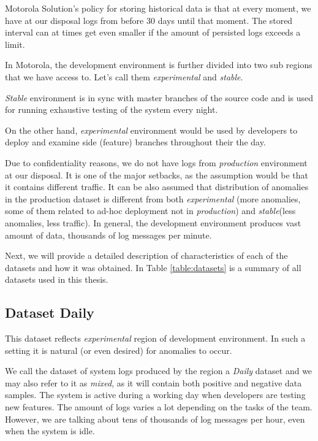 Motorola Solution's policy for storing historical data is that at every moment, we have at our disposal logs from before $30$ days until that moment. The stored interval can at times get even smaller if the amount of persisted logs exceeds a limit.

In Motorola, the development environment is further divided into two sub regions that we have access to. 
Let's call them \textit{experimental} and \textit{stable}. 

\textit{Stable} environment is in sync with master branches of the source code and is used for running exhaustive testing of the system every night. 

On the other hand, \textit{experimental} environment would be used by developers to deploy and examine side (feature) branches throughout their the day.

Due to confidentiality reasons, we do not have logs from \textit{production} environment at our disposal. It is one of the major setbacks, as the assumption would be that it contains different traffic. It can be also assumed that distribution of anomalies in the production dataset is different from both \textit{experimental} (more anomalies, some of them related to ad-hoc deployment not in \textit{production}) and \textit{stable}(less anomalies, less traffic). In general, the development environment produces vast amount of data, thousands of log messages per minute.

Next, we will provide a detailed description of characteristics of each of the datasets and how it was obtained. In Table \ref{table:datasets} is a summary of all datasets used in this thesis.

\subsection{Dataset Daily} 
This dataset reflects \textit{experimental} region of development environment. In such a setting it is natural (or even desired) for anomalies to occur.

We call the dataset of system logs produced by the region a \textit{Daily} dataset and we may also refer to it as \textit{mixed}, as it will contain both positive and negative data samples. 
The system is active during a working day when developers are testing new features. The amount of logs varies a lot depending on the tasks of the team. 
However, we are talking about tens of thousands of log messages per hour, even when the system is idle.

